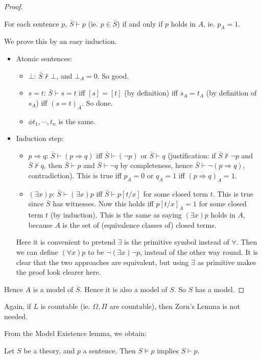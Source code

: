 \documentclass[a4paper]{article}
\begin{document}
\begin{proof}
  \begin{claim}
    For each sentence $p$, $\bar S\vdash p$ (ie. $p\in \bar S$) if and only if $p$ holds in $A$, ie. $p_A = 1$.
  \end{claim}
  We prove this by an easy induction.
  \begin{itemize}
    \item Atomic sentences:
      \begin{itemize}
        \item $\bot$: $\bar S \not\vdash \bot$, and $\bot_A = 0$. So good.
        \item $s = t$: $\bar S \vdash s = t$ iff $[s] = [t]$ (by definition) iff $s_A = t_A$ (by definition of $s_A$) iff $(s = t)_A$. So done.
        \item $\phi t_1, \cdots, t_n$ is the same.
      \end{itemize}
    \item Induction step:
      \begin{itemize}
        \item $p\Rightarrow q$: $\bar S\vdash (p \Rightarrow q)$ iff $\bar S \vdash (\neg p)$ or $\bar S\vdash q$ (justification: if $\bar S \not\vdash \neg p$ and $\bar S\not\vdash q$, then $\bar S\vdash p$ and $\bar S \vdash \neg q$ by completeness, hence $\bar S\vdash \neg(p\Rightarrow q)$, contradiction). This is true iff $p_A = 0$ or $q_A = 1$ iff $(p\Rightarrow q)_A = 1$.
        \item $(\exists x)p$: $\bar S \vdash (\exists x)p$ iff $\bar S\vdash p[t/x]$ for some closed term $t$. This is true since $\bar S$ has witnesses. Now this holds iff $p[t/x]_A = 1$ for some closed term $t$ (by induction). This is the same as saying $(\exists x)p$ holds in $A$, because $A$ is the set of (equivalence classes of) closed terms.
      \end{itemize}
      Here it is convenient to pretend $\exists$ is the primitive symbol instead of $\forall$. Then we can define $(\forall x) p$ to be $\neg (\exists x)\neg p$, instead of the other way round. It is clear that the two approaches are equivalent, but using $\exists $ as primitive makes the proof look clearer here.
  \end{itemize}
  Hence $A$ is a model of $\bar S$. Hence it is also a model of $S$. So $S$ has a model.
\end{proof}
Again, if $L$ is countable (ie. $\Omega, \Pi$ are countable), then Zorn's Lemma is not needed.

From the Model Existence lemma, we obtain:
\begin{cor}
  Let $S$ be a theory, and $p$ a sentence. Then $S\models p$ implies $S\vdash p$.
\end{cor}
\end{document}
